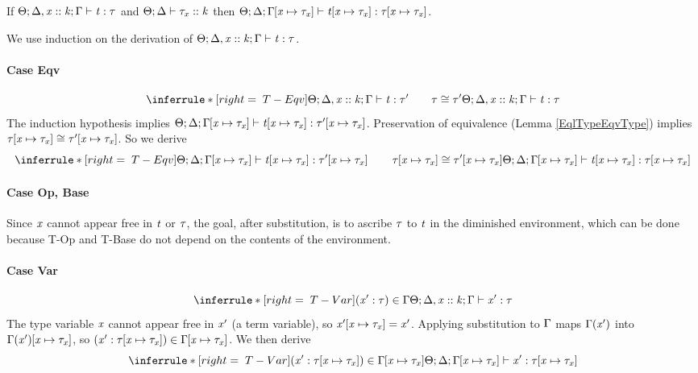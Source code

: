 \begin{lemma}
  \label{TESub}
  If $\Theta;\Delta,\mathit{x} :: \mathit{k};\Gamma \vdash \mathit{t} : \mathit{\tau}$
  and $\Theta;\Delta \vdash \mathit{\tau}_{\mathit{x}} :: \mathit{k}$
  then $\Theta;\Delta;\Gamma\hspace{-2pt}\left[ \mathit{x} \mapsto \mathit{\tau}_{\mathit{x}} \right] \vdash \mathit{t}\hspace{-2pt}\left[ \mathit{x} \mapsto \mathit{\tau}_{\mathit{x}} \right] : \mathit{\tau}\hspace{-2pt}\left[ \mathit{x} \mapsto \mathit{\tau}_{\mathit{x}} \right]$.
\end{lemma}
\begin{sproof}
  We use induction on the derivation of
  $\Theta;\Delta,\mathit{x} :: \mathit{k};\Gamma \vdash \mathit{t} : \mathit{\tau}$.
  \paragraph{Case {\sc Eqv}}
  \[{\infr[T-Eqv]
    {\typeof{\sEnv}{\kEnv, \haskind{\var}{\kind}}{\tEnv}{\term}{\type'}
      \qquad \teqv{\type}{\type'}}
    {\typeof{\sEnv}{\kEnv, \haskind{\var}{\kind}}{\tEnv}
      {\term}
      {\type}}}\]
  The induction hypothesis implies
  $\Theta;\Delta;\Gamma\hspace{-2pt}\left[ \mathit{x} \mapsto \mathit{\tau}_{\mathit{x}} \right] \vdash \mathit{t}\hspace{-2pt}\left[ \mathit{x} \mapsto \mathit{\tau}_{\mathit{x}} \right] : \mathit{\tau}'\hspace{-2pt}\left[ \mathit{x} \mapsto \mathit{\tau}_{\mathit{x}} \right]$.
  Preservation of equivalence (Lemma \ref{EqlTypeEqvType}) implies
  $\mathit{\tau}\hspace{-2pt}\left[ \mathit{x} \mapsto \mathit{\tau}_{\mathit{x}} \right] \cong \mathit{\tau}'\hspace{-2pt}\left[ \mathit{x} \mapsto \mathit{\tau}_{\mathit{x}} \right]$.
  So we derive
  \[{\infr[T-Eqv]
    {\typeof{\sEnv}{\kEnv}{\typesubst{\tEnv}}{\typesubst{\term}}{\typesubst{\type'}}
      \qquad \teqv{\typesubst{\type}}{\typesubst{\type'}}}
    {\typeof{\sEnv}{\kEnv}{\typesubst{\tEnv}}
      {\typesubst{\term}}
      {\typesubst{\type}}}}\]
  \paragraph{Case {\sc Op}, {\sc Base}}
  Since $\mathit{x}$ cannot appear free in $\mathit{t}$ or $\mathit{\tau}$,
  the goal, after substitution, is to ascribe $\mathit{\tau}$ to $\mathit{t}$
  in the diminished environment,
  which can be done because
  {\sc T-Op} and {\sc T-Base} do not depend on the contents of the environment.
  \paragraph{Case {\sc Var}}
  \[{\infr[T-Var]
    {\parens{\hastype{\var'}{\type}} \in \tEnv}
    {\typeof{\sEnv}{\kEnv, \haskind{\var}{\kind}}{\tEnv}
      {\var'}
      {\type}}}\]
  The type variable $\mathit{x}$ cannot appear free in $\mathit{x}'$ (a term variable),
  so $\mathit{x}'\hspace{-2pt}\left[ \mathit{x} \mapsto \mathit{\tau}_{\mathit{x}} \right] = \mathit{x}'$.
  Applying substitution to $\Gamma$ maps $\Gamma(\mathit{x}')$ into $\Gamma(\mathit{x}')\hspace{-2pt}\left[ \mathit{x} \mapsto \mathit{\tau}_{\mathit{x}} \right]$,
  so $\left( \mathit{x}' : \mathit{\tau}\hspace{-2pt}\left[ \mathit{x} \mapsto \mathit{\tau}_{\mathit{x}} \right] \right) \in \Gamma\hspace{-2pt}\left[ \mathit{x} \mapsto \mathit{\tau}_{\mathit{x}} \right]$.
  We then derive
  \[\infr[T-Var]
  {\parens{\hastype{\var'}{\typesubst{\type}}} \in \typesubst{\tEnv}}
  {\typeof{\sEnv}{\kEnv}{\typesubst{\tEnv}}
    {\var'}
    {\typesubst{\type}}}\]

\end{sproof}
